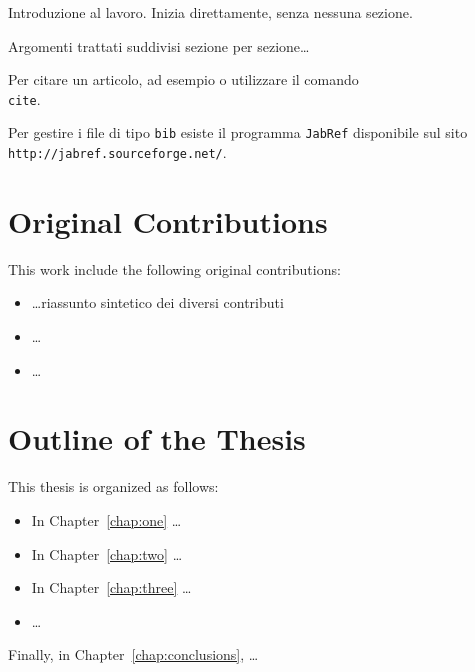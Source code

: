 Introduzione al lavoro. Inizia direttamente, senza nessuna sezione.

Argomenti trattati suddivisi sezione per sezione\dots

Per citare un articolo, ad esempio \cite{Ackley1987} o \cite{Ackley1987,Altenberg1994} utilizzare il comando \texttt{\\cite}. 

Per gestire i file di tipo \texttt{bib} esiste il programma \texttt{JabRef} disponibile sul sito \texttt{http://jabref.sourceforge.net/}.

\section*{Original Contributions}
This work include the following original contributions:
\begin{itemize}
\item \dots riassunto sintetico dei diversi contributi
\item \dots
\item \dots
\end{itemize}

\section*{Outline of the Thesis}
This thesis is organized as follows: 
\begin{itemize}
\item In Chapter~\ref{chap:one} \dots
\item In Chapter~\ref{chap:two} \dots
\item In Chapter~\ref{chap:three} \dots
\item \dots
\end{itemize}
Finally, in Chapter~\ref{chap:conclusions}, \dots



